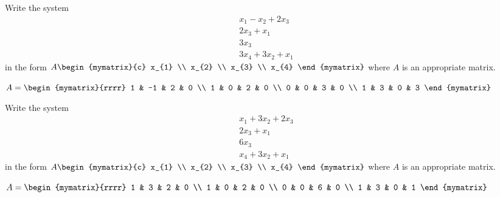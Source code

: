 \begin{enumialphparenastyle}
\begin{ex} Write the system
\begin{equation*}
\begin{array}{c}
x_{1}-x_{2}+2x_{3} \\
2x_{3}+x_{1} \\
3x_{3} \\
3x_{4}+3x_{2}+x_{1}
\end{array}
\end{equation*}
 in the form $A\begin{mymatrix}{c}
x_{1} \\
x_{2} \\
x_{3} \\
x_{4}
\end{mymatrix} $ where $A$ is an appropriate matrix.
\begin{sol}
$A=\begin{mymatrix}{rrrr}
1 & -1 & 2 & 0 \\
1 & 0 & 2 & 0 \\
0 & 0 & 3 & 0 \\
1 & 3 & 0 & 3
\end{mymatrix} $
\end{sol}
\end{ex}

\begin{ex} Write the system
\begin{equation*}
\begin{array}{c}
x_{1}+3x_{2}+2x_{3} \\
2x_{3}+x_{1} \\
6x_{3} \\
x_{4}+3x_{2}+x_{1}
\end{array}
\end{equation*}
 in the form $A\begin{mymatrix}{c}
x_{1} \\
x_{2} \\
x_{3} \\
x_{4}
\end{mymatrix} $ where $A$ is an appropriate matrix.
\begin{sol}
$A=\begin{mymatrix}{rrrr}
1 & 3 & 2 & 0 \\
1 & 0 & 2 & 0 \\
0 & 0 & 6 & 0 \\
1 & 3 & 0 & 1
\end{mymatrix}$
\end{sol}
\end{ex}


\end{enumialphparenastyle}
